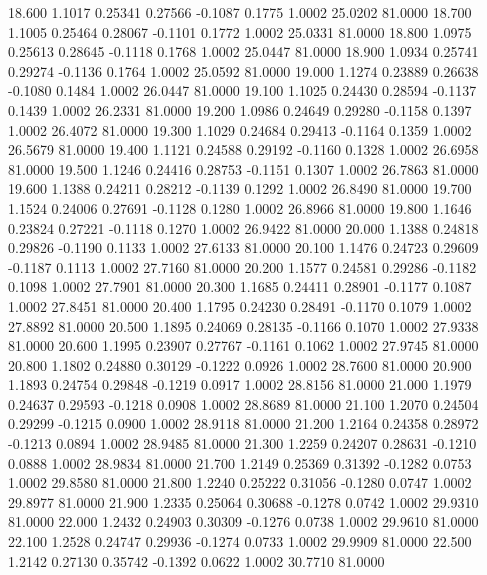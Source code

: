   18.600   1.1017   0.25341   0.27566  -0.1087   0.1775   1.0002  25.0202  81.0000
  18.700   1.1005   0.25464   0.28067  -0.1101   0.1772   1.0002  25.0331  81.0000
  18.800   1.0975   0.25613   0.28645  -0.1118   0.1768   1.0002  25.0447  81.0000
  18.900   1.0934   0.25741   0.29274  -0.1136   0.1764   1.0002  25.0592  81.0000
  19.000   1.1274   0.23889   0.26638  -0.1080   0.1484   1.0002  26.0447  81.0000
  19.100   1.1025   0.24430   0.28594  -0.1137   0.1439   1.0002  26.2331  81.0000
  19.200   1.0986   0.24649   0.29280  -0.1158   0.1397   1.0002  26.4072  81.0000
  19.300   1.1029   0.24684   0.29413  -0.1164   0.1359   1.0002  26.5679  81.0000
  19.400   1.1121   0.24588   0.29192  -0.1160   0.1328   1.0002  26.6958  81.0000
  19.500   1.1246   0.24416   0.28753  -0.1151   0.1307   1.0002  26.7863  81.0000
  19.600   1.1388   0.24211   0.28212  -0.1139   0.1292   1.0002  26.8490  81.0000
  19.700   1.1524   0.24006   0.27691  -0.1128   0.1280   1.0002  26.8966  81.0000
  19.800   1.1646   0.23824   0.27221  -0.1118   0.1270   1.0002  26.9422  81.0000
  20.000   1.1388   0.24818   0.29826  -0.1190   0.1133   1.0002  27.6133  81.0000
  20.100   1.1476   0.24723   0.29609  -0.1187   0.1113   1.0002  27.7160  81.0000
  20.200   1.1577   0.24581   0.29286  -0.1182   0.1098   1.0002  27.7901  81.0000
  20.300   1.1685   0.24411   0.28901  -0.1177   0.1087   1.0002  27.8451  81.0000
  20.400   1.1795   0.24230   0.28491  -0.1170   0.1079   1.0002  27.8892  81.0000
  20.500   1.1895   0.24069   0.28135  -0.1166   0.1070   1.0002  27.9338  81.0000
  20.600   1.1995   0.23907   0.27767  -0.1161   0.1062   1.0002  27.9745  81.0000
  20.800   1.1802   0.24880   0.30129  -0.1222   0.0926   1.0002  28.7600  81.0000
  20.900   1.1893   0.24754   0.29848  -0.1219   0.0917   1.0002  28.8156  81.0000
  21.000   1.1979   0.24637   0.29593  -0.1218   0.0908   1.0002  28.8689  81.0000
  21.100   1.2070   0.24504   0.29299  -0.1215   0.0900   1.0002  28.9118  81.0000
  21.200   1.2164   0.24358   0.28972  -0.1213   0.0894   1.0002  28.9485  81.0000
  21.300   1.2259   0.24207   0.28631  -0.1210   0.0888   1.0002  28.9834  81.0000
  21.700   1.2149   0.25369   0.31392  -0.1282   0.0753   1.0002  29.8580  81.0000
  21.800   1.2240   0.25222   0.31056  -0.1280   0.0747   1.0002  29.8977  81.0000
  21.900   1.2335   0.25064   0.30688  -0.1278   0.0742   1.0002  29.9310  81.0000
  22.000   1.2432   0.24903   0.30309  -0.1276   0.0738   1.0002  29.9610  81.0000
  22.100   1.2528   0.24747   0.29936  -0.1274   0.0733   1.0002  29.9909  81.0000
  22.500   1.2142   0.27130   0.35742  -0.1392   0.0622   1.0002  30.7710  81.0000
